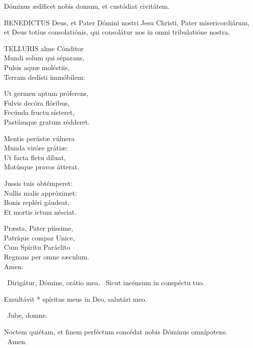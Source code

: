  Dóminus ædíficet nobis domum, et custódiat civitátem.



\lettrine[lines=2]{B}{ENEDICTUS} Deus, et Pater Dómini nostri Jesu Christi, Pater misericordiárum, et Deus totíus consolatiónis, qui consolátur nos in omni tribulatióne nostra.


\lettrine[lines=2]{T}{ELLURIS} alme Cónditor\\
Mundi solum qui séparans,\\
Pulsis aquæ moléstiis,\\
Terram dedísti immóbilem:

Ut germen aptum próferens,\\
Fulvis decóra flóribus,\\
Fecúnda fructu sísteret,\\
Pastúmque gratum rédderet.

Mentis perústæ vúlnera\\
Munda viróre grátiæ:\\
Ut facta fletu díluat,\\
Motúsque pravos átterat.

Jussis tuis obtémperet:\\
Nullis malis appróximet:\\
Bonis repléri gáudeat,\\
Et mortis ictum nésciat.

Præsta, Pater piíssime,\\
Patríque compar Unice,\\
Cum Spíritu Paráclito\\
Regnans per omne sæculum.\\
Amen.

\V\ Dirigátur, Dómine, orátio mea. \R\ Sicut incénsum in conspéctu tuo.

 Exsultávit * spíritus meus in Deo, salutári meo.



\V\ Jube, domne.

 Noctem quiétam, et finem perféctum concédat nobis Dóminus omnípotens. \R\ Amen.


